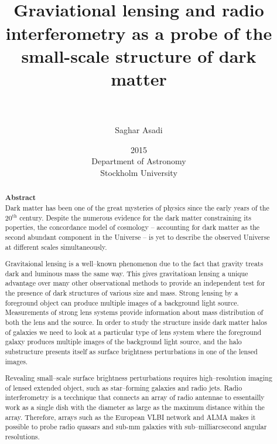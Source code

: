 \documentclass[paper=a4, fontsize=11pt]{scrartcl} %
\title{    
\normalfont \normalsize 
\horrule{0.5pt} \\[0.4cm] %
\huge Graviational lensing and radio interferometry as a probe of the small-scale structure of dark matter\\
\horrule{2pt} \\[0.5cm] %
}
\author{Saghar Asadi} %
\date{\normalsize 2015 \\ Department of Astronomy \\ Stockholm University} %
\numberwithin{equation}{section} %
\numberwithin{figure}{section} %
\numberwithin{table}{section} %
\begin{document}
\maketitle %
\newpage
\tableofcontents
\newpage

\begin{abstract}
{\Large \bf Abstract}\\


Dark matter has been one of the great mysteries of physics since the early years of the 20$^\mathrm{th}$ century. Despite the numerous evidence for the dark matter constraining its poperties, the concordance model of cosmology -- accounting for dark matter as the second abundant component in the Universe -- is yet to describe the observed Universe at different scales simultaneously.

Gravitaional lensing is a well--known phenomenon due to the fact that gravity treats dark and luminous mass the same way. This gives gravitatioan lensing a unique advantage over many other observational methods to provide an independent test for the presence of dark structures of various size and mass. Strong lensing by a foreground object can produce multiple images of a background light source. Measurements of strong lens systems provide information about mass distribution of both the lens and the source. In order to study the structure inside dark matter halos of galaxies we need to look at a particular type of lens system where the foreground galaxy produces multiple images of the background light source, and the halo substructure presents itself as surface brightness perturbations in one of the lensed images.

Revealing small--scale surface brightness perturbations requires high--resolution imaging of lensed extended object, such as star--forming galaxies and radio jets. Radio interferometry is a tecchnique that connects an array of radio antennae to essentailly work as a single dish with the diameter as large as the maximum distance within the array. Therefore, arrays such as the European VLBI network and ALMA makes it possible to probe radio quasars and sub-mm galaxies with sub--milliarcsecond angular resolutions.


\end{abstract}
\end{document}
